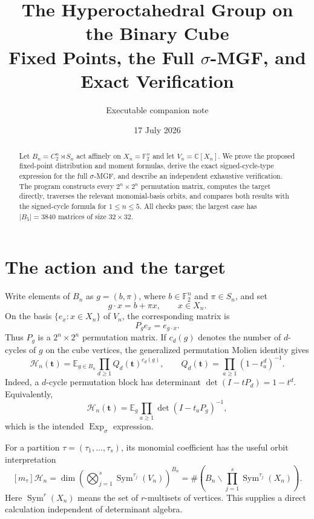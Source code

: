 \documentclass[11pt]{article}
\title{The Hyperoctahedral Group on the Binary Cube\\
Fixed Points, the Full $\sigma$-MGF, and Exact Verification}
\author{Executable companion note}
\date{17 July 2026}
\newcommand{\F}{\mathbb F}
\newcommand{\C}{\mathbb C}
\newcommand{\E}{\mathbb E}
\newcommand{\Sym}{\operatorname{Sym}}
\newcommand{\Exp}{\operatorname{Exp}}
\begin{document}
\maketitle

\begin{abstract}
Let $B_n=C_2^n\rtimes S_n$ act affinely on $X_n=\F_2^n$ and let
$V_n=\C[X_n]$.  We prove the proposed fixed-point distribution and moment
formulas, derive the exact signed-cycle-type expression for the full
$\sigma$-MGF, and describe an independent exhaustive verification.  The
program constructs every $2^n\times2^n$ permutation matrix, computes the
target directly, traverses the relevant monomial-basis orbits, and compares
both results with the signed-cycle formula for $1\leq n\leq5$.  All checks
pass; the largest case has $|B_5|=3840$ matrices of size $32\times32$.
\end{abstract}

\section{The action and the target}
Write elements of $B_n$ as $g=(b,\pi)$, where $b\in\F_2^n$ and
$\pi\in S_n$, and set
\[
g\cdot x=b+\pi x,\qquad x\in X_n.
\]
On the basis $\{e_x:x\in X_n\}$ of $V_n$, the corresponding matrix is
\begin{equation}\label{eq:matrix}
P_g e_x=e_{g\cdot x}.
\end{equation}
Thus $P_g$ is a $2^n\times2^n$ permutation matrix.  If $c_d(g)$ denotes the
number of $d$-cycles of $g$ on the cube vertices, the generalized permutation
Molien identity gives
\begin{equation}\label{eq:molien}
\mathcal H_n(\mathbf t)
=\E_{g\in B_n}\prod_{d\geq1}Q_d(\mathbf t)^{c_d(g)},
\qquad
Q_d(\mathbf t)=\prod_{a\geq1}(1-t_a^d)^{-1}.
\end{equation}
Indeed, a $d$-cycle permutation block has determinant
$\det(I-tP_d)=1-t^d$.  Equivalently,
\[
\mathcal H_n(\mathbf t)
=\E_g\prod_{a\geq1}\det(I-t_aP_g)^{-1},
\]
which is the intended $\Exp_\sigma$ expression.

For a partition $\tau=(\tau_1,\ldots,\tau_s)$, its monomial coefficient has
the useful orbit interpretation
\begin{equation}\label{eq:orbit-coeff}
[m_\tau]\mathcal H_n
=\dim\left(\bigotimes_{j=1}^s\Sym^{\tau_j}(V_n)\right)^{B_n}
=\#\left(B_n\backslash\prod_{j=1}^s\Sym^{\tau_j}(X_n)\right).
\end{equation}
Here $\Sym^r(X_n)$ means the set of $r$-multisets of vertices.  This supplies
a direct calculation independent of determinant algebra.
\end{document}
